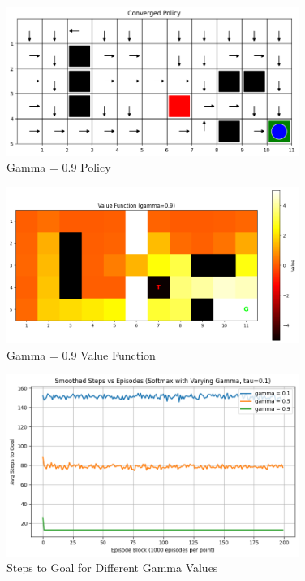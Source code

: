 \documentclass[12pt]{article}
\begin{document}
\begin{figure}[H]
  \centering
  \includegraphics[width=0.85\textwidth]{images/part2_q2_gamma_0.9_policy.png}
  \caption{Gamma = 0.9 Policy}
\end{figure}
\begin{figure}[H]
  \centering
  \includegraphics[width=0.85\textwidth]{images/part2_q2_gamma_0.9_value.png}
  \caption{Gamma = 0.9 Value Function}
\end{figure}

\begin{figure}[H]
  \centering
  \includegraphics[width=0.85\textwidth]{images/part2_q2_steps_vs_gamma.png}
  \caption{Steps to Goal for Different Gamma Values}
\end{figure}
\end{document}

